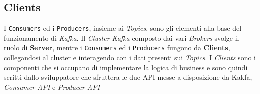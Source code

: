 \subsection{Clients}
\label{subsec:kakfa_clients}
I \texttt{Consumers} ed i \texttt{Producers}, insieme ai \textit{Topics}, sono gli elementi alla base del funzionamento di \textit{Kafka}.
Il \textit{Cluster Kafka} composto dai vari \textit{Brokers} svolge il ruolo di \textbf{Server}, mentre i \texttt{Consumers} ed i \texttt{Producers} fungono da \textbf{Clients},
collegandosi al cluster e interagendo con i dati presenti sui \textit{Topics}.
I \textit{Clients} sono i componenti che si occupano di implementare la logica di business e sono quindi scritti dallo sviluppatore che sfruttera le due API messe a disposizione da Kakfa,
\textit{Consumer API} e \textit{Producer API}

